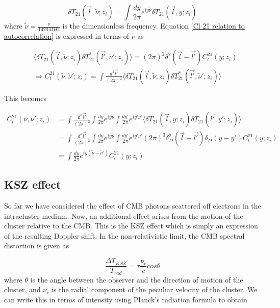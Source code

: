 \documentclass[12pt]{article}
\begin{document}
\begin{equation}\label{nu fourier of l}
\delta T_{21}(\vec{l},\tilde{\nu};z_i)=\int \frac{dy}{2\pi}e^{iy\tilde{\nu}}\delta T_{21}(\vec{l},y;z_i)
\end{equation}
where $\tilde{\nu}=\frac{\nu}{1420 MHz}$ is the dimensionless frequency. Equation \ref{Cl 21 relation to autocorrelation} is expressed in terms of $\tilde{\nu}$ as

\begin{equation}\label{Cl 21 cm ito nu}
\begin{aligned}
&\langle  \delta T_{21}(\vec{l},\tilde{\nu};z_i) \delta T_{21}^*(\vec{l'},\tilde{\nu}';z_i)\rangle  =(2 \pi)^2\delta^2(\vec{l}-\vec{l'})C_l^{21}(y;z_i)
\\&
\Rightarrow C_l^{21}(\tilde{\nu},\tilde{\nu}';z_i)=\int \frac{d^2\vec{l'}}{(2\pi)^2} \langle  \delta T_{21}(\vec{l},\tilde{\nu};z_i) \delta T_{21}^*(\vec{l'},\tilde{\nu}';z_i)\rangle  
\end{aligned}
\end{equation}

This becomes

\begin{equation}
\begin{aligned}
C_l^{21}(\tilde{\nu},\tilde{\nu}';z_i)&=\int \frac{d^2\vec{l'}}{(2\pi)^2} \int \frac{dy}{2\pi}e^{iy\tilde{\nu}}\int \frac{dy'}{2\pi}e^{iy'\tilde{\nu}'}\langle  \delta T_{21}(\vec{l},y;z_i)\delta T_{21}(\vec{l'},y';z_i)\rangle  
\\&=\int \frac{d^2\vec{l'}}{(2\pi)^2} \int \frac{dy}{2\pi}e^{iy\tilde{\nu}}\int \frac{dy'}{2\pi}e^{iy'\tilde{\nu}'}(2 \pi)^3\delta_D^2(\vec{l}-\vec{l'})\delta_D(y-y')C_l^{21}(y;z_i)
\\&=\int \frac{dy}{2\pi}e^{iy(\tilde{\nu}-\tilde{\nu}')}C_l^{21}(y;z_i)
\end{aligned}
\end{equation}

\subsection{KSZ effect}
So far we have considered the effect of CMB photons scattered off electrons in the intracluster medium. Now, an additional effect arises from the motion of the cluster relative to the CMB. This is the KSZ effect which is simply an expression of the resulting Doppler shift. In the non-relativistic limit, the CMB spectral distortion is given as

\begin{equation}\label{temp distortion due to ksz}
\frac{\Delta T_{KSZ}}{T_{rad}}=\tau \frac{\nu_r}{c}cos\theta
\end{equation}
where $\theta$ is the angle between the observer and the direction of motion of the cluster, and $\nu_r$ is the radial component of the peculiar velocity of the cluster. We can write this in terms of intensity using Planck's radiation formula to obtain 
\end{document}
